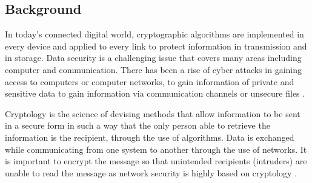 \subsection{Background}

In today's connected digital world, cryptographic algorithms are implemented in every device and applied to every link to protect information in transmission and in storage.
Data security is a challenging issue that covers many areas including computer and communication.
There has been a rise of cyber attacks in gaining access to computers or computer networks, to gain information of private and sensitive data to gain information via communication channels or unsecure files \cite{csis2025significant}. 

Cryptology is the science of devising methods that allow information to be sent in a secure form in such a way that the only person able to retrieve the information is the recipient, through the use of algorithms. 
Data is exchanged while communicating from one system to another through the use of networks. 
It is important to encrypt the message so that unintended recipients (intruders) are unable to read the message as network security is highly based on cryptology  \cite{Bhanot_2015}.

